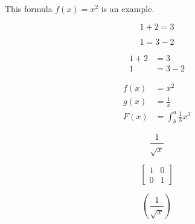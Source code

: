 \documentclass{article}
\begin{document}
This formula $f(x) = x^2$ is an example.

\begin{equation*}
  1 + 2 = 3 
\end{equation*}

\begin{equation*}
  1 = 3 - 2
\end{equation*}

\begin{align*}
  1 + 2 &= 3\\
  1 &= 3 - 2
\end{align*}

\begin{align*}
  f(x) &= x^2\\
  g(x) &= \frac{1}{x}\\
  F(x) &= \int^a_b \frac{1}{3}x^3
\end{align*}

\begin{equation*}
  \frac{1}{\sqrt{x}}
\end{equation*}


\begin{equation*}
\left[
\begin{matrix}
1 & 0\\
0 & 1
\end{matrix}
\right]
\end{equation*}

\begin{equation*}
\left(\frac{1}{\sqrt{x}}\right)
\end{equation*}
\end{document}
